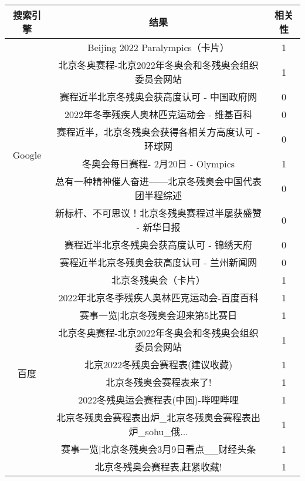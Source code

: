 \documentclass[a4paper]{article}
\begin{document}
\begin{center}
  \begin{tabular}{ |c|c|c| }
    \hline
    搜索引擎 & 结果 & 相关性 \\ \hline
    \multirow{10}{*}{Google}  & Beijing 2022 Paralympics（卡片） & 1 \\ \cline{2-3}
    & 北京冬奥赛程-北京2022年冬奥会和冬残奥会组织委员会网站 & 1 \\ \cline{2-3}
    & 赛程近半北京冬残奥会获高度认可 - 中国政府网 & 0 \\ \cline{2-3}
    & 2022年冬季残疾人奥林匹克运动会 - 维基百科 & 0 \\ \cline{2-3}
    & 赛程近半，北京冬残奥会获得各相关方高度认可 - 环球网 & 0 \\ \cline{2-3}
    & 冬奥会每日赛程- 2月20日 - Olympics & 1 \\ \cline{2-3}
    & 总有一种精神催人奋进——北京冬残奥会中国代表团半程综述 & 0 \\ \cline{2-3}
    & 新标杆、不可思议！北京冬残奥赛程过半屡获盛赞 - 新华日报 & 0 \\ \cline{2-3}
    & 赛程近半北京冬残奥会获高度认可 - 锦绣天府 & 0 \\ \cline{2-3}
    & 赛程近半北京冬残奥会获高度认可 - 兰州新闻网 & 0 \\ \cline{2-3}

    \hline\hline
    \multirow{10}{*}{百度}  & 北京冬残奥会（卡片） & 1 \\ \cline{2-3}
    & 2022年北京冬季残疾人奥林匹克运动会-百度百科 & 1 \\ \cline{2-3}
    & 赛事一览|北京冬残奥会迎来第5比赛日 & 1 \\ \cline{2-3}
    & 北京冬奥赛程-北京2022年冬奥会和冬残奥会组织委员会网站 & 1 \\ \cline{2-3}
    & 北京2022冬残奥会赛程表(建议收藏) & 1 \\ \cline{2-3}
    & 北京冬残奥会赛程表来了! & 1 \\ \cline{2-3}
    & 2022冬残奥运会赛程表(中国)-哔哩哔哩 & 1 \\ \cline{2-3}
    & 北京冬残奥会赛程表出炉\_北京冬残奥会赛程表出炉\_sohu\_俄... & 1 \\ \cline{2-3}
    & 赛事一览|北京冬残奥会3月9日看点\_\_财经头条 & 1 \\ \cline{2-3}
    & 北京冬残奥会赛程表,赶紧收藏! & 1 \\ \cline{2-3}
    \hline
  \end{tabular}
\end{center}
\pagebreak
\end{document}
